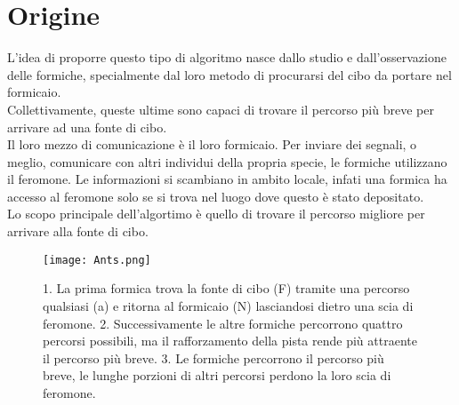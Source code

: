 \documentclass[a4paper,12pt]{report}
\begin{document}
\section{Origine}
\vspace{1.5cm}
L'idea di proporre questo tipo di algoritmo nasce dallo studio e dall'osservazione delle formiche, specialmente dal loro metodo di procurarsi del cibo da portare nel formicaio.\\
Collettivamente, queste ultime sono capaci di trovare il percorso più breve per arrivare ad una fonte di cibo.\\
Il loro mezzo di comunicazione è il loro formicaio. Per inviare dei segnali, o meglio, comunicare con altri individui della propria specie, le formiche utilizzano il feromone. Le informazioni si scambiano in ambito locale, infati una formica ha accesso al feromone solo se si trova nel luogo dove questo è stato depositato.\\
Lo scopo principale dell'algortimo è quello di trovare il percorso migliore per arrivare alla fonte di cibo.\\
\begin{figure}[H]
    \centering
    \texttt{[image: Ants.png]}
    \caption{1. La prima formica trova la fonte di cibo (F) tramite una percorso qualsiasi (a) e ritorna al formicaio (N) lasciandosi dietro una scia di feromone. 2. Successivamente le altre formiche percorrono quattro percorsi possibili, ma il rafforzamento della pista rende più attraente il percorso più breve. 3. Le formiche percorrono il percorso più breve, le lunghe porzioni di altri percorsi perdono la loro scia di feromone. }
    \label{fig:my_label}
\end{figure}
\end{document}
